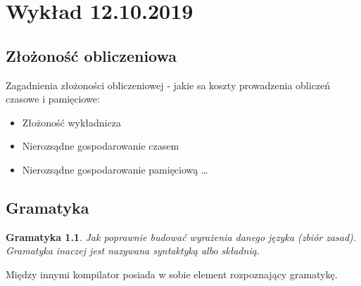 \chapter{Wykład 12.10.2019}
\label{ch:wyklad1}

\section{Złożoność obliczeniowa}

Zagadnienia złożoności obliczeniowej
- jakie sa koszty prowadzenia obliczeń czasowe i pamięciowe:
\begin{itemize}
  \item Złożoność wykładnicza
  \item Nierozsądne gospodarowanie czasem
  \item Nierozsądne gospodarowanie pamięciową \ldots
\end{itemize}


\section{Gramatyka}

\newtheorem*{theorem*}{Gramatyka}
\begin{theorem*} Jak poprawnie budować wyrażenia danego języka (zbiór zasad).
Gramatyka inaczej jest nazywana syntaktyką albo składnią. \end{theorem*}





Między innymi kompilator posiada w sobie element rozpoznający gramatykę. \newline




